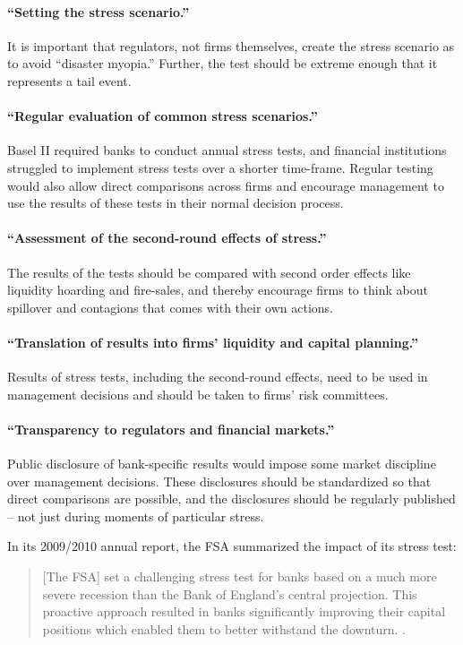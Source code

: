 \documentclass[12pt]{article}
\begin{document}
\paragraph{``Setting the stress scenario.''} It is important that regulators, not firms themselves, create the stress scenario as to avoid ``disaster myopia.'' Further, the test should be extreme enough that it represents a tail event.

\paragraph{``Regular evaluation of common stress scenarios.''} Basel II required banks to conduct annual stress tests, and financial institutions struggled to implement stress tests over a shorter time-frame. Regular testing would also allow direct comparisons across firms and encourage management to use the results of these tests in their normal decision process.

\paragraph{``Assessment of the second-round effects of stress.''} The results of the tests should be compared with second order effects like liquidity hoarding and fire-sales, and thereby encourage firms to think about spillover and contagions that comes with their own actions.

\paragraph{``Translation of results into firms' liquidity and capital planning.''} Results of stress tests, including the second-round effects, need to be used in management decisions and should be taken to firms' risk committees.

\paragraph{``Transparency to regulators and financial markets.''} Public disclosure of bank-specific results would impose some market discipline over management decisions. These disclosures should be standardized so that direct comparisons are possible, and the disclosures should be regularly published -- not just during moments of particular stress.


In its 2009/2010 annual report, the FSA summarized the impact of its stress test:

\begin{quote}
[The FSA] set a challenging stress test for banks based on a much more severe recession than the Bank of England’s central projection. This proactive approach resulted in banks significantly improving their capital positions which enabled them to better withstand the downturn. \citep{FSAReport}.
\end{quote}
\end{document}
